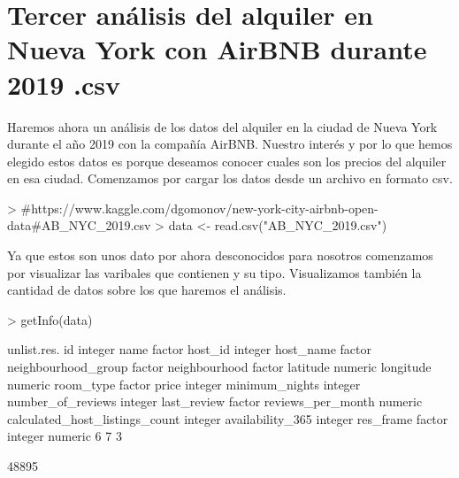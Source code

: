 \documentclass [a4paper] {article}
\begin{document}
\section{Tercer análisis del alquiler en Nueva York con AirBNB durante 2019 .csv}

Haremos ahora un análisis de los datos del alquiler en la ciudad de Nueva York durante el año 2019 con la compañía AirBNB.
Nuestro interés y por lo que hemos elegido estos datos es porque deseamos conocer cuales son los precios del alquiler en esa ciudad.
Comenzamos por cargar los datos desde un archivo en formato csv.
\begin{Schunk}
\begin{Sinput}
> #https://www.kaggle.com/dgomonov/new-york-city-airbnb-open-data#AB_NYC_2019.csv
> data <- read.csv("AB_NYC_2019.csv")
\end{Sinput}
\end{Schunk}

Ya que estos son unos dato por ahora desconocidos para nosotros comenzamos por visualizar las varibales que contienen y su tipo.
Visualizamos también la cantidad de datos sobre los que haremos el análisis.
\begin{Schunk}
\begin{Sinput}
> getInfo(data)
\end{Sinput}
\begin{Soutput}
                               unlist.res.
id                                 integer
name                                factor
host_id                            integer
host_name                           factor
neighbourhood_group                 factor
neighbourhood                       factor
latitude                           numeric
longitude                          numeric
room_type                           factor
price                              integer
minimum_nights                     integer
number_of_reviews                  integer
last_review                         factor
reviews_per_month                  numeric
calculated_host_listings_count     integer
availability_365                   integer
res_frame
 factor integer numeric 
      6       7       3 
\end{Soutput}
\begin{Soutput}
[1] 48895
\end{Soutput}
\end{Schunk}
\end{document}
